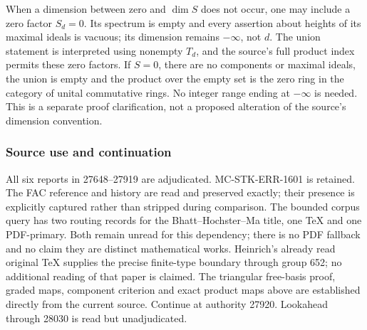 When a dimension between zero and \(\dim S\) does not occur, one may include a zero factor \(S_d=0\). Its spectrum is empty and every assertion about heights of its maximal ideals is vacuous; its dimension remains \(-\infty\), not \(d\). The union statement is interpreted using nonempty \(T_d\), and the source's full product index permits these zero factors. If \(S=0\), there are no components or maximal ideals, the union is empty and the product over the empty set is the zero ring in the category of unital commutative rings. No integer range ending at \(-\infty\) is needed. This is a separate proof clarification, not a proposed alteration of the source's dimension convention.

\subsubsection{Source use and continuation}\label{algebra-proof-025-source-use-and-continuation}

All six reports in 27648--27919 are adjudicated. MC-\AlgebraIdentifierBreak{}STK-\AlgebraIdentifierBreak{}ERR-\AlgebraIdentifierBreak{}1601 is retained. The FAC reference and history are read and preserved exactly; their presence is explicitly captured rather than stripped during comparison. The bounded corpus query has two routing records for the Bhatt--Hochster--Ma title, one TeX and one PDF-primary. Both remain unread for this dependency; there is no PDF fallback and no claim they are distinct mathematical works. Heinrich's already read original TeX supplies the precise finite-type boundary through group 652; no additional reading of that paper is claimed. The triangular free-basis proof, graded maps, component criterion and exact product maps above are established directly from the current source. Continue at authority 27920. Lookahead through 28030 is read but unadjudicated.
